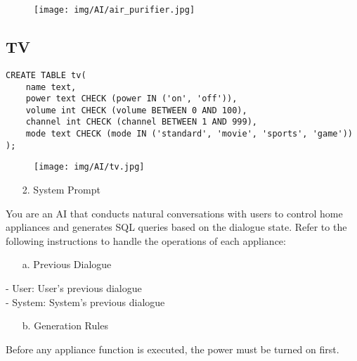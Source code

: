 \documentclass[conference]{IEEEtran}
\begin{document}
\begin{figure}[h]
\hspace{1.5cm}
\centering
\begin{minipage}{0.8\columnwidth}
    \texttt{[image: img/AI/air\_purifier.jpg]}
\end{minipage}
\end{figure}

\subsection*{TV}
\begin{lstlisting}
CREATE TABLE tv(
    name text,
    power text CHECK (power IN ('on', 'off')),
    volume int CHECK (volume BETWEEN 0 AND 100),
    channel int CHECK (channel BETWEEN 1 AND 999),
    mode text CHECK (mode IN ('standard', 'movie', 'sports', 'game'))
);
\end{lstlisting}
\begin{figure}[h]
\hspace{1.5cm}
\centering
\begin{minipage}{0.8\columnwidth}
    \texttt{[image: img/AI/tv.jpg]}
\end{minipage}
\end{figure}

\begin{itemize}
    \item[2.] System Prompt
\end{itemize}
You are an AI that conducts natural conversations with users to control home appliances and generates SQL queries based on the dialogue state. Refer to the following instructions to handle the operations of each appliance: \\

\begin{enumerate}

\begin{itemize}
    \item[a.] Previous Dialogue
\end{itemize}
- User: {User's previous dialogue} \\
- System: {System's previous dialogue} \\

\begin{itemize}
    \item[b.] Generation Rules
\end{itemize}
Before any appliance function is executed, the power must be turned on first. \\ \\

\end{enumerate}
\end{document}
